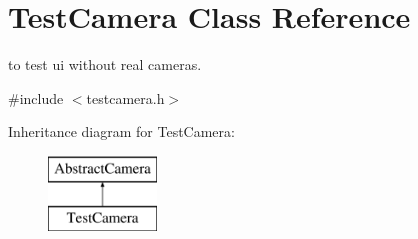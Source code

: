 \hypertarget{class_test_camera}{\section{Test\-Camera Class Reference}
\label{class_test_camera}
}


to test ui without real cameras.  




{\ttfamily \#include $<$testcamera.\-h$>$}

Inheritance diagram for Test\-Camera\-:\begin{figure}[H]
\begin{center}
\leavevmode
\includegraphics[height=2.000000cm]{class_test_camera}
\end{center}
\end{figure}

